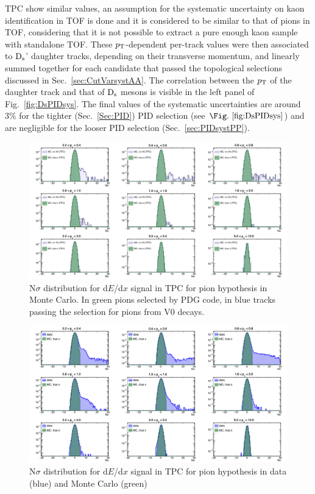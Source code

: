 TPC show similar values, an assumption for the systematic uncertainty 
on kaon identification in TOF is done and it is considered to be similar to that of pions in TOF,
considering that it is not possible to extract a pure enough kaon
sample with standalone TOF.
These $p_{\rm T}$-dependent per-track values were then associated to
${\rm D_s}$' daughter tracks, depending on their transverse momentum, and linearly summed together 
for each candidate that passed the topological selections discussed 
in Sec.~\ref{sec:CutVarsystAA}. The correlation between the
$p_{\rm T}$ of the daughter track and that of ${\rm D_s}$ mesons is visible in the
left panel of Fig.~\ref{fig:DsPIDsys}.
The final values of the systematic uncertainties are around 
3\% for the tighter (Sec.~\ref{Sec:PID}) PID selection (see $\Fig.~\ref{fig:DsPIDsys}$) and are negligible for the
looser PID selection (Sec.~\ref{sec:PIDsystPP}).

\begin{figure}[!h]
 \centering
 \includegraphics[angle=0, width=15cm]{./FigCap5/PionTPC_MC.png}
 \caption{N$\sigma$ distribution for d$E$/d$x$ signal in TPC for pion hypothesis in Monte Carlo. In green pions selected by PDG code, in blue tracks passing the selection for pions from V0 decays.}
 \label{fig:MCPionsTPC} 
\end{figure}

\begin{figure}[!h]
 \centering
 \includegraphics[angle=0, width=15cm]{./FigCap5/PionTPC_DataMC.png}
 \caption{N$\sigma$ distribution for d$E$/d$x$ signal in TPC for pion hypothesis in data (blue) and Monte Carlo (green)}
 \label{fig:DataPionsTPC} 
\end{figure}

